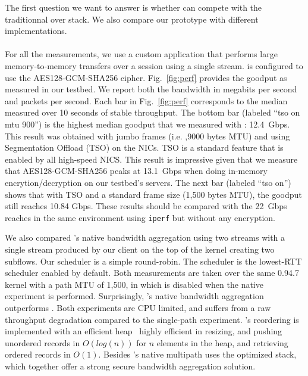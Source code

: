 The first question we want to answer is whether \tcpls can compete with the
traditionnal \tls over \tcp stack. We also compare our \tcpls prototype with
different \quic implementations.

\paragraph*{\tcpls}
For all the \tcpls measurements, we use a custom application that performs
large memory-to-memory transfers over a \tcpls session using a single stream.
\tcpls is configured to use the AES128-GCM-SHA256 cipher. Fig.~\ref{fig:perf} provides the goodput as measured in our testbed. We report both the bandwidth in megabits per second and packets per second. Each bar in Fig.~\ref{fig:perf} corresponds to the median measured over 10 seconds of stable throughput. The bottom bar (labeled ``\tcpls tso on mtu 900'') is the highest median goodput that we measured with \tcpls: 12.4~Gbps. This result was obtained with jumbo frames (i.e. ,9000 bytes MTU) and using \tcp Segmentation Offload (TSO) on the NICs. TSO is a standard feature that is enabled by all high-speed NICS. This result is impressive given that we measure that AES128-GCM-SHA256 peaks at 13.1~Gbps when doing in-memory encrytion/decryption on our testbed's servers.
The next bar (labeled ``\tcpls tso on'') shows that with TSO and a standard frame size (1,500 bytes MTU), the goodput still reaches 10.84 Gbps. These
results should be compared with the 22~Gbps \tcp reaches in the same
environment using \texttt{iperf} but without any encryption.



We also compared \tcpls's native bandwidth aggregation using two streams with a
single stream produced by our \tcpls client on the top of the \mptcp kernel
creating two \mptcp subflows. Our \tcpls scheduler is a simple round-robin. The
\mptcp scheduler is the lowest-RTT scheduler enabled by default. Both
measurements are taken over the same 0.94.7 \mptcp kernel with a path MTU of
1,500, in which \mptcp is disabled when the \tcpls native experiment is
performed.  Surprisingly, \tcpls's native bandwidth aggregation outperforms
\mptcp. Both experiments are CPU limited, and suffers from a raw throughput
degradation compared to the single-path experiment. \tcpls's reordering is
implemented with an efficient heap~\cite{heap-github} highly efficient in
resizing, and pushing unordered records
in $O(log(n))$ for $n$ elements in the heap, and retrieving ordered records in
$O(1)$. Besides \tcpls's native  multipath uses the \tcp optimized stack, which
together offer a strong secure bandwidth aggregation solution.

